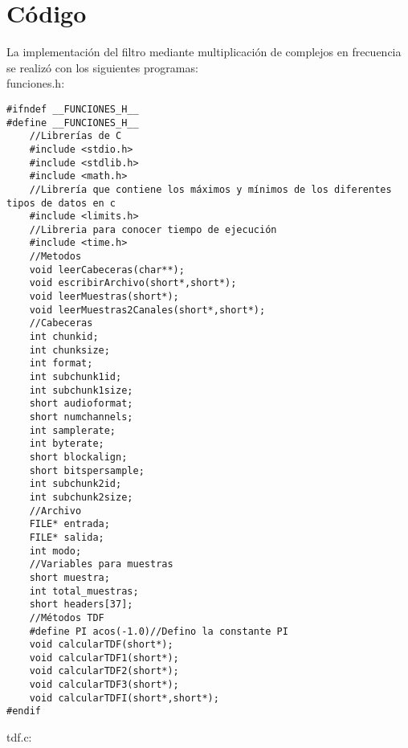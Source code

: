 \section{Código}
La implementación del filtro mediante multiplicación de complejos en frecuencia se realizó con los siguientes programas:\\
funciones.h:
\begin{lstlisting}[style=CStyle]
#ifndef __FUNCIONES_H__
#define __FUNCIONES_H__
	//Librerías de C
	#include <stdio.h>
	#include <stdlib.h>
	#include <math.h>
	//Librería que contiene los máximos y mínimos de los diferentes tipos de datos en c
	#include <limits.h>
	//Libreria para conocer tiempo de ejecución
	#include <time.h>
	//Metodos
	void leerCabeceras(char**);
	void escribirArchivo(short*,short*);
	void leerMuestras(short*);
	void leerMuestras2Canales(short*,short*);
	//Cabeceras
	int chunkid;
	int chunksize;
	int format;
	int subchunk1id;
	int subchunk1size;
	short audioformat;
	short numchannels;
	int samplerate;
	int byterate;
	short blockalign;
	short bitspersample;
	int subchunk2id;
	int subchunk2size;
	//Archivo
	FILE* entrada;
	FILE* salida;
	int modo;
	//Variables para muestras
	short muestra;
	int total_muestras;
	short headers[37];
	//Métodos TDF
	#define PI acos(-1.0)//Defino la constante PI
	void calcularTDF(short*);
	void calcularTDF1(short*);
	void calcularTDF2(short*);
	void calcularTDF3(short*);
	void calcularTDFI(short*,short*);
#endif
\end{lstlisting}
tdf.c:
